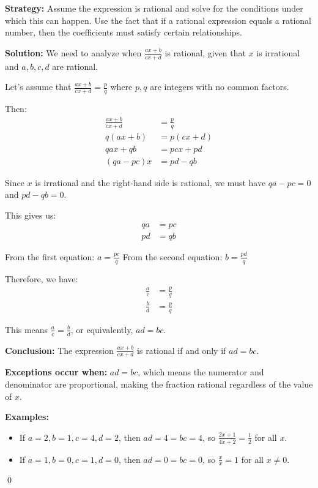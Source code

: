 \noindent\textbf{Strategy:} Assume the expression is rational and solve for the conditions under which this can happen. Use the fact that if a rational expression equals a rational number, then the coefficients must satisfy certain relationships.

\bigskip\noindent\textbf{Solution:}
We need to analyze when $\frac{ax + b}{cx + d}$ is rational, given that $x$ is irrational and $a, b, c, d$ are rational.

Let's assume that $\frac{ax + b}{cx + d} = \frac{p}{q}$ where $p, q$ are integers with no common factors.

Then:
\begin{align*}
\frac{ax + b}{cx + d} &= \frac{p}{q} \\
q(ax + b) &= p(cx + d) \\
qax + qb &= pcx + pd \\
(qa - pc)x &= pd - qb
\end{align*}

Since $x$ is irrational and the right-hand side is rational, we must have $qa - pc = 0$ and $pd - qb = 0$.

This gives us:
\begin{align*}
qa &= pc \\
pd &= qb
\end{align*}

From the first equation: $a = \frac{pc}{q}$
From the second equation: $b = \frac{pd}{q}$

Therefore, we have:
\begin{align*}
\frac{a}{c} &= \frac{p}{q} \\
\frac{b}{d} &= \frac{p}{q}
\end{align*}

This means $\frac{a}{c} = \frac{b}{d}$, or equivalently, $ad = bc$.

\textbf{Conclusion:}
The expression $\frac{ax + b}{cx + d}$ is rational if and only if $ad = bc$.

\textbf{Exceptions occur when:}
$ad = bc$, which means the numerator and denominator are proportional, making the fraction rational regardless of the value of $x$.

\textbf{Examples:}
\begin{itemize}
\item If $a = 2, b = 1, c = 4, d = 2$, then $ad = 4 = bc = 4$, so $\frac{2x + 1}{4x + 2} = \frac{1}{2}$ for all $x$.
\item If $a = 1, b = 0, c = 1, d = 0$, then $ad = 0 = bc = 0$, so $\frac{x}{x} = 1$ for all $x \neq 0$.
\end{itemize}\qed


